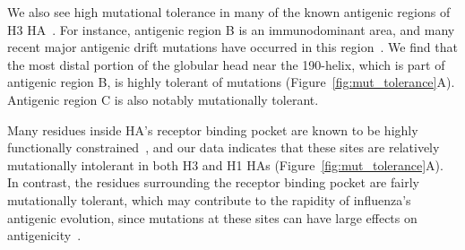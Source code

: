 \documentclass[9pt,twocolumn,twoside]{pnas-new}
\begin{document}
We also see high mutational tolerance in many of the known antigenic regions of H3 HA~\cite{wiley1981structural}.
For instance, antigenic region B is an immunodominant area, and many recent major antigenic drift mutations have occurred in this region~\cite{chambers2015identification,koel2013substitutions,popova2012immunodominance}.
We find that the most distal portion of the globular head near the 190-helix, which is part of antigenic region B, is highly tolerant of mutations (Figure~\ref{fig:mut_tolerance}A).
Antigenic region C is also notably mutationally tolerant.

Many residues inside HA's receptor binding pocket are known to be highly functionally constrained~\cite{wilson1981structure,martin1998studies}, and our data indicates that these sites are relatively mutationally intolerant in both H3 and H1 HAs (Figure~\ref{fig:mut_tolerance}A).
In contrast, the residues surrounding the receptor binding pocket are fairly mutationally tolerant, which may contribute to the rapidity of influenza's antigenic evolution, since mutations at these sites can have large effects on antigenicity~\cite{wiley1981structural,koel2013substitutions}.
\end{document}
